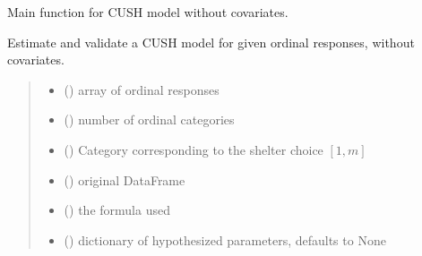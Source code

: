 \documentclass[letterpaper,10pt,english]{sphinxmanual}
\begin{document}
\begin{fulllineitems}
\label{\detokenize{cubmods:cubmods.cush.mle}}
\pysigstartsignatures
{}
\pysigstopsignatures
\sphinxAtStartPar
Main function for CUSH model without covariates.

\sphinxAtStartPar
Estimate and validate a CUSH model for given ordinal responses, without covariates.
\begin{quote}\begin{description}
\begin{itemize}
\item {} 
\sphinxAtStartPar
{} () \textendash{} array of ordinal responses

\item {} 
\sphinxAtStartPar
{} () \textendash{} number of ordinal categories

\item {} 
\sphinxAtStartPar
{} () \textendash{} Category corresponding to the shelter choice \([1,m]\)

\item {} 
\sphinxAtStartPar
{} () \textendash{} original DataFrame

\item {} 
\sphinxAtStartPar
{} () \textendash{} the formula used

\item {} 
\sphinxAtStartPar
{} (\sphinxstyleliteralemphasis{\sphinxupquote{, }}) \textendash{} dictionary of hypothesized parameters, defaults to None


\end{itemize}
\end{description}
\end{quote}
\end{fulllineitems}
\end{document}
